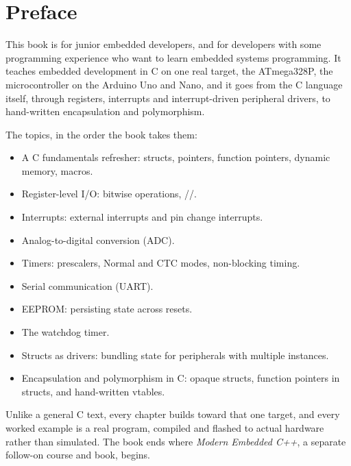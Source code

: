 
\chapter{Preface}

This book is for junior embedded developers, and for developers with some programming experience
who want to learn embedded systems programming. It teaches embedded development in C on one real
target, the ATmega328P, the microcontroller on the Arduino Uno and Nano, and it goes from the C
language itself, through registers, interrupts and interrupt-driven peripheral drivers, to
hand-written encapsulation and polymorphism.

The topics, in the order the book takes them:
\begin{itemize}
  \item A C fundamentals refresher: structs, pointers, function pointers, dynamic memory, macros.
  \item Register-level I/O: bitwise operations, //.
  \item Interrupts: external interrupts and pin change interrupts.
  \item Analog-to-digital conversion (ADC).
  \item Timers: prescalers, Normal and CTC modes, non-blocking timing.
  \item Serial communication (UART).
  \item EEPROM: persisting state across resets.
  \item The watchdog timer.
  \item Structs as drivers: bundling state for peripherals with multiple instances.
  \item Encapsulation and polymorphism in C: opaque structs, function pointers in structs, and
    hand-written vtables.
\end{itemize}

Unlike a general C text, every chapter builds toward that one target, and every worked example is a
real program, compiled and flashed to actual hardware rather than simulated. The book ends where
\emph{Modern Embedded C++}, a separate follow-on course and book, begins.

